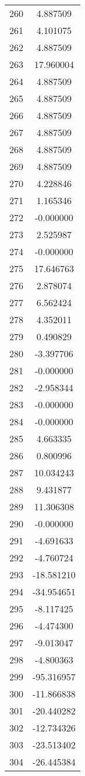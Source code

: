 \documentclass[12pt]{article}
\begin{document}
\begin{longtable}{@{}cc@{}}
260 & 4.887509 \\
261 & 4.101075 \\
262 & 4.887509 \\
263 & 17.960004 \\
264 & 4.887509 \\
265 & 4.887509 \\
266 & 4.887509 \\
267 & 4.887509 \\
268 & 4.887509 \\
269 & 4.887509 \\
270 & 4.228846 \\
271 & 1.165346 \\
272 & -0.000000 \\
273 & 2.525987 \\
274 & -0.000000 \\
275 & 17.646763 \\
276 & 2.878074 \\
277 & 6.562424 \\
278 & 4.352011 \\
279 & 0.490829 \\
280 & -3.397706 \\
281 & -0.000000 \\
282 & -2.958344 \\
283 & -0.000000 \\
284 & -0.000000 \\
285 & 4.663335 \\
286 & 0.800996 \\
287 & 10.034243 \\
288 & 9.431877 \\
289 & 11.306308 \\
290 & -0.000000 \\
291 & -4.691633 \\
292 & -4.760724 \\
293 & -18.581210 \\
294 & -34.954651 \\
295 & -8.117425 \\
296 & -4.474300 \\
297 & -9.013047 \\
298 & -4.800363 \\
299 & -95.316957 \\
300 & -11.866838 \\
301 & -20.440282 \\
302 & -12.734326 \\
303 & -23.513402 \\
304 & -26.445384 \\

\end{longtable}
\end{document}
